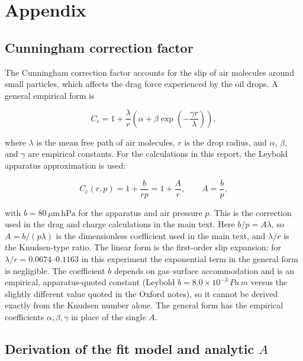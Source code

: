 \documentclass[12pt,a4paper]{article}
\begin{document}
\newpage

\appendix
\section{Appendix}
\subsection{Cunningham correction factor}
\label{app:cunningham}

The Cunningham correction factor accounts for the slip of air molecules around
small particles, which affects the drag force experienced by the oil drops.
A general empirical form is

\begin{equation}
    C_{\mathrm{c}} = 1 + \frac{\lambda}{r}
    \left(\alpha + \beta\exp\left(-\frac{\gamma r}{\lambda}\right)\right),
\end{equation}

where $\lambda$ is the mean free path of air molecules, $r$ is the drop
radius, and $\alpha$, $\beta$, and $\gamma$ are empirical constants. For the
calculations in this report, the Leybold apparatus approximation is used:

\begin{equation}
    C_{\mathrm{c}}(r,p) = 1 + \frac{b}{rp}
    = 1 + \frac{A}{r},
    \qquad A=\frac{b}{p},
\end{equation}

with $b=80\,\mu\mathrm{m\,hPa}$ for the apparatus and air pressure $p$.
This is the correction used in the drag and charge calculations in the main
text. Here $b/p=A\lambda$, so $A=b/(p\lambda)$ is the dimensionless coefficient
used in the main text, and $\lambda/r$ is the Knudsen-type ratio. The linear
form is the first-order slip expansion; for $\lambda/r=0.0674$--$0.1163$ in this
experiment the exponential term in the general form is negligible. The
coefficient $b$ depends on gas--surface accommodation and is an empirical,
apparatus-quoted constant (Leybold $b=8.0\times10^{-3}\,\si{Pa\,m}$ versus the
slightly different value quoted in the Oxford notes), so it cannot be derived
exactly from the Knudsen number alone. The general form has the empirical
coefficients $\alpha,\beta,\gamma$ in place of the single $A$.

\subsection{Derivation of the fit model and analytic $A$}
\end{document}
